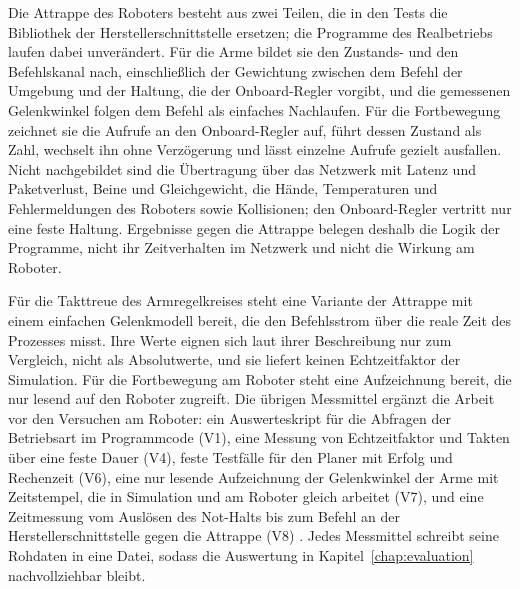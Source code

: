 Die Attrappe des Roboters besteht aus zwei Teilen, die in den Tests die Bibliothek der Herstellerschnittstelle ersetzen; die Programme des Realbetriebs laufen dabei unverändert.
Für die Arme bildet sie den Zustands- und den Befehlskanal nach, einschließlich der Gewichtung zwischen dem Befehl der Umgebung und der Haltung, die der Onboard-Regler vorgibt, und die gemessenen Gelenkwinkel folgen dem Befehl als einfaches Nachlaufen.
Für die Fortbewegung zeichnet sie die Aufrufe an den Onboard-Regler auf, führt dessen Zustand als Zahl, wechselt ihn ohne Verzögerung und lässt einzelne Aufrufe gezielt ausfallen.
Nicht nachgebildet sind die Übertragung über das Netzwerk mit Latenz und Paketverlust, Beine und Gleichgewicht, die Hände, Temperaturen und Fehlermeldungen des Roboters sowie Kollisionen; den Onboard-Regler vertritt nur eine feste Haltung.
Ergebnisse gegen die Attrappe belegen deshalb die Logik der Programme, nicht ihr Zeitverhalten im Netzwerk und nicht die Wirkung am Roboter.

Für die Takttreue des Armregelkreises steht eine Variante der Attrappe mit einem einfachen Gelenkmodell bereit, die den Befehlsstrom über die reale Zeit des Prozesses misst.
Ihre Werte eignen sich laut ihrer Beschreibung nur zum Vergleich, nicht als Absolutwerte, und sie liefert keinen Echtzeitfaktor der Simulation.
Für die Fortbewegung am Roboter steht eine Aufzeichnung bereit, die nur lesend auf den Roboter zugreift.
Die übrigen Messmittel ergänzt die Arbeit vor den Versuchen am Roboter: ein Auswerteskript für die Abfragen der Betriebsart im Programmcode (V1), eine Messung von Echtzeitfaktor und Takten über eine feste Dauer (V4), feste Testfälle für den Planer mit Erfolg und Rechenzeit (V6), eine nur lesende Aufzeichnung der Gelenkwinkel der Arme mit Zeitstempel, die in Simulation und am Roboter gleich arbeitet (V7), und eine Zeitmessung vom Auslösen des Not-Halts bis zum Befehl an der Herstellerschnittstelle gegen die Attrappe (V8) .
Jedes Messmittel schreibt seine Rohdaten in eine Datei, sodass die Auswertung in Kapitel~\ref{chap:evaluation} nachvollziehbar bleibt.
